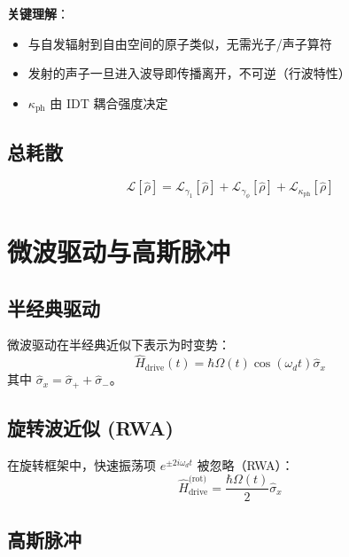 \documentclass[12pt,a4paper]{article}
\theoremstyle{definition}
\begin{document}
\textbf{关键理解}：
\begin{itemize}
    \item 与自发辐射到自由空间的原子类似，无需光子/声子算符
    \item 发射的声子一旦进入波导即传播离开，不可逆（行波特性）
    \item $\kappa_{\text{ph}}$ 由 IDT 耦合强度决定
\end{itemize}

\subsection{总耗散}

\begin{equation}
    \mathcal{L}[\hat{\rho}] = \mathcal{L}_{\gamma_1}[\hat{\rho}] + \mathcal{L}_{\gamma_\phi}[\hat{\rho}] + \mathcal{L}_{\kappa_{\text{ph}}}[\hat{\rho}]
    \label{eq:total_dissipation}
\end{equation}

\section{微波驱动与高斯脉冲}

\subsection{半经典驱动}

微波驱动在半经典近似下表示为时变势：
\begin{equation}
    \hat{H}_{\text{drive}}(t) = \hbar\Omega(t)\cos(\omega_d t)\hat{\sigma}_x
    \label{eq:drive_hamiltonian_lab}
\end{equation}
其中 $\hat{\sigma}_x = \hat{\sigma}_+ + \hat{\sigma}_-$。

\subsection{旋转波近似 (RWA)}

在旋转框架中，快速振荡项 $e^{\pm 2i\omega_d t}$ 被忽略（RWA）：
\begin{equation}
    \hat{H}_{\text{drive}}^{\text{(rot)}} = \frac{\hbar\Omega(t)}{2}\hat{\sigma}_x
    \label{eq:drive_rwa}
\end{equation}

\subsection{高斯脉冲}
\end{document}
